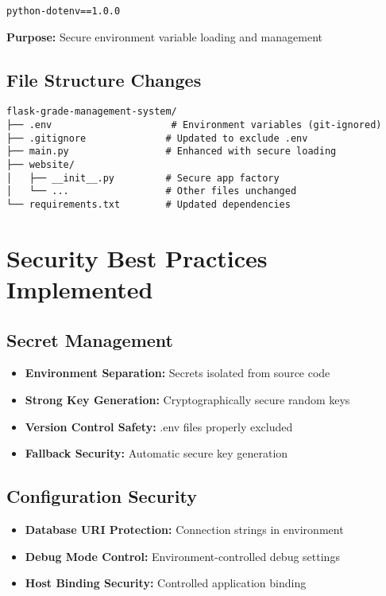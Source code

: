 \documentclass[12pt,a4paper]{article}
\begin{document}
\begin{lstlisting}[caption=Security Dependencies]
python-dotenv==1.0.0
\end{lstlisting}

\textbf{Purpose:} Secure environment variable loading and management

\subsection{File Structure Changes}

\begin{lstlisting}[caption=Updated Project Structure]
flask-grade-management-system/
├── .env                     # Environment variables (git-ignored)
├── .gitignore              # Updated to exclude .env
├── main.py                 # Enhanced with secure loading
├── website/
│   ├── __init__.py         # Secure app factory
│   └── ...                 # Other files unchanged
└── requirements.txt        # Updated dependencies
\end{lstlisting}

\section{Security Best Practices Implemented}

\subsection{Secret Management}
\begin{itemize}
    \item \textbf{Environment Separation:} Secrets isolated from source code
    \item \textbf{Strong Key Generation:} Cryptographically secure random keys
    \item \textbf{Version Control Safety:} .env files properly excluded
    \item \textbf{Fallback Security:} Automatic secure key generation
\end{itemize}

\subsection{Configuration Security}
\begin{itemize}
    \item \textbf{Database URI Protection:} Connection strings in environment
    \item \textbf{Debug Mode Control:} Environment-controlled debug settings
    \item \textbf{Host Binding Security:} Controlled application binding
\end{itemize}
\end{document}
